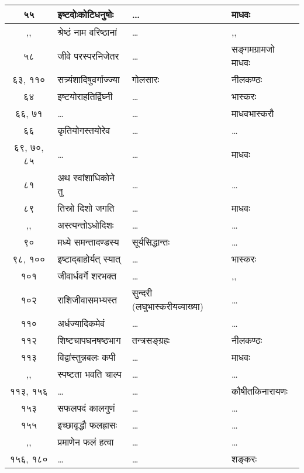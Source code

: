 \documentclass[11pt, openany]{book}
\begin{document}
\begin{center}
\begin{longtable}{|c|p{4.2cm}|p{3cm}|p{2.7cm}|}
		\hline
		५५ & इष्टदोःकोटिधनुषोः\textemdash  & \ldots  & माधवः  \\
		\hline
		,, & श्रेष्ठं नाम वरिष्ठानां\textemdash  & \ldots  & ,, \\
		\hline
		५८ & जीवे परस्परनिजेतर\textemdash & \ldots  & सङ्गमग्रामजो माधवः \\
		\hline
		६३, ११० & सत्र्यंशादिषुवर्गाज्ज्या\textemdash & गोलसारः  & नीलकण्ठः \\
		\hline
		६४ & इष्टयोराहतिर्द्विघ्नी\textemdash & \ldots  & भास्करः \\
		\hline
		६६, ७१ & \ldots  & \ldots & माधवभास्करौ  \\
		\hline
		६६ & कृतियोगस्तयोरेव\textemdash & \ldots  & \ldots \\
		\hline
		६९, ७०, ८५ & \ldots  & \ldots  & माधवः \\
		\hline
		८१ & अथ स्वांशाधिकोने तु\textemdash & \ldots  & \ldots \\
		\hline
		८९ & तिस्रो दिशो जगति\textemdash  & \ldots  & माधवः \\
		\hline
		,, & अस्त्यन्तोऽधोदिशः\textemdash  & \ldots & \ldots \\
		\hline
		९० & मध्ये समन्तादण्डस्य\textemdash & सूर्यसिद्धान्तः  & \ldots \\
		\hline
		९८, १०० & इष्टाद्बाहोर्यत् स्यात्\textemdash  & \ldots  & भास्करः \\
		\hline
		१०१ & जीवार्धवर्गे शरभक्त\textemdash  & \ldots  & ,, \\
		\hline
		१०२ & राशिजीवासमभ्यस्त\textemdash & सुन्दरी (लघुभास्करीयव्याख्या)  & \ldots \\
		\hline
		११० & अर्धज्यादिकमेवं\textemdash & \ldots  & \ldots \\
		\hline
		११२ & शिष्टचापघनषष्ठभाग\textemdash & तन्त्रसङ्ग्रहः  & नीलकण्ठः \\
		\hline
		११३ & विद्वांस्तुन्नबलः कपी\textemdash & \ldots  & माधवः \\
		\hline
		,, & स्पष्टता भवति चाल्प\textemdash & \ldots  & \ldots \\
		\hline
		११३, १५६ & \ldots   & \ldots  & कौषीतकिनारायणः \\
		\hline
		१५३  & सफलपदं कालगुणं\textemdash & \ldots  & \ldots \\
		\hline
		१५५ & इच्छावृद्धौ फलह्रासः\textemdash & \ldots  & \ldots \\
		\hline
		,, & प्रमाणेन फलं हत्वा\textemdash  & \ldots  & \ldots \\
		\hline
		१५६, १८०  & \ldots  & \ldots  & शङ्करः \\

\end{longtable}
\end{center}
\end{document}
